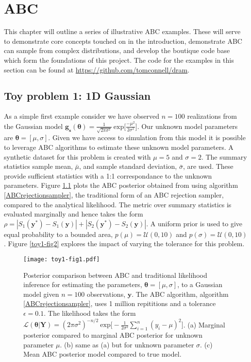 \chapter{ABC}

This chapter will outline a series of illustrative ABC examples. These will serve to demonstrate core concepts touched on in the introduction, demonstrate ABC can sample from complex distributions, and develop the boutique code base which form the foundations of this project. The code for the examples in this section can be found at \url{https://github.com/tomconnell/dram}.\\

\section{Toy problem 1: 1D Gaussian}
As a simple first example consider we have observed $n = 100$ realizations from the Gaussian model $\bm{g_s}(\bm{\theta}) = \frac{1}{\sqrt{2\pi\sigma^2}}\ \text{exp}\Big[\frac{-\mu^2}{2\sigma^2}\Big]$. Our unknown model parameters are $\bm{\theta} = [\mu,\sigma]$. Given we have access to simulation from this model it is possible to leverage ABC algorithms to estimate these unknown model parameters. A synthetic dataset for this problem is created with $\mu = 5$ and $\sigma = 2$. The summary statistics sample mean, $\bar{\mu}$, and sample standard deviation, $\bar{\sigma}$, are used. These provide sufficient statistics with a 1:1 correspondance to the unknown parameters. Figure \ref{toy1-fig1} plots the ABC posterior obtained from using algorithm \ref{ABCrejectionsampler}, the traditional form of an ABC rejection sampler, compared to the analytical likelihood. The metric over summary statistics is evaluated marginally and hence takes the form $\rho = |S_1(\bm{y^*}) - S_1(\bm{y})| +| S_2(\bm{y^*}) - S_2(\bm{y})|$. A uniform prior is used to give equal probability to a bounded area, $p(\mu) = \mathcal{U}(0,10)$ and $p(\sigma) = \mathcal{U}(0,10)$. 
Figure \ref{toy1-fig2} explores the impact of varying the tolerance for this problem.\\

\begin{figure}[H]
	\centering
	\texttt{[image: toy1-fig1.pdf]}
	\caption{Posterior comparison between ABC and traditional likelihood inference for estimating the parameters, $\bm{\theta} = [\mu,\sigma]$, to a Gaussian model given $n = 100$ observations, $\bm{y}$. The ABC algorithm, algorithm \ref{ABCrejectionsampler}, uses 1 million repititions and a tolerance $\epsilon = 0.1$. The likelihood takes the form $\mathcal{L}(\bm{\theta}|\bm{Y}) = (2\pi\sigma^2)^{-n/2}\ \text{exp}\big[-\frac{1}{2\sigma^2}\sum_{i = 1}^{n}(y_i-\mu)^2\big]$. (a) Marginal posterior compared to marginal ABC posterior for unknown parameter $\mu$. (b) same as (a) but for unknown parameter $\sigma$. (c) Mean ABC posterior model compared to true model.}
	\label{toy1-fig1}
\end{figure}

